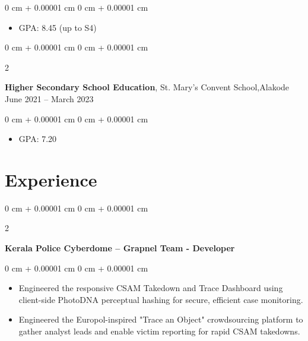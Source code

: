 \documentclass[10pt, a4paper]{article}
\newenvironment{highlights}{
    \begin{itemize}[
        topsep=0.10 cm,
        parsep=0.10 cm,
        partopsep=0pt,
        itemsep=0pt,
        leftmargin=0 cm + 10pt
    ]
}{
    \end{itemize}
} %
\newenvironment{onecolentry}{
    \begin{adjustwidth}{
        0 cm + 0.00001 cm
    }{
        0 cm + 0.00001 cm
    }
}{
    \end{adjustwidth}
} %
\newenvironment{twocolentry}[2][]{
    \onecolentry
    \def\secondColumn{#2}
    \setcolumnwidth{\fill, 4.5 cm}
    \begin{paracol}{2}
}{
    \switchcolumn \raggedleft \secondColumn
    \end{paracol}
    \endonecolentry
} %
\begin{document}
        \vspace{0.10 cm}
        \begin{onecolentry}
            \begin{highlights}
                \item GPA: 8.45 (up to S4)
            \end{highlights}
        \end{onecolentry}

         \begin{twocolentry}{
            June 2021 – March 2023
        }
        
            \textbf{Higher Secondary School Education}, St. Mary's Convent School,Alakode\end{twocolentry}

        \vspace{0.10 cm}
        \begin{onecolentry}
            \begin{highlights}
                \item GPA: 7.20
            \end{highlights}
        \end{onecolentry}

    \section{Experience}

    \vspace{0.2 cm}

\begin{twocolentry}{
}
    \textbf{Kerala Police Cyberdome – Grapnel Team - Developer}
\end{twocolentry}

\vspace{0.10 cm}
\begin{onecolentry}
    \begin{highlights}
        \item Engineered the responsive CSAM Takedown and Trace Dashboard using client-side PhotoDNA perceptual hashing for secure, efficient case monitoring.
        \item Engineered the Europol-inspired "Trace an Object" crowdsourcing platform to gather analyst leads and enable victim reporting for rapid CSAM takedowns.
    \end{highlights}
\end{onecolentry}

    \vspace{0.2 cm}
\end{document}
